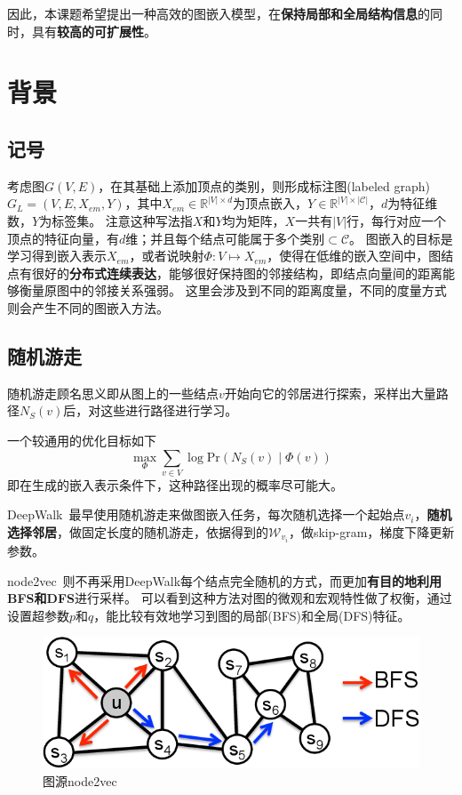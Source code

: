 \documentclass[reportComp]{thesis}
\begin{document}
因此，本课题希望提出一种高效的图嵌入模型，在\textbf{保持局部和全局结构信息}的同时，具有\textbf{较高的可扩展性}。

\section{背景}
\subsection{记号}
考虑图$G(V,E)$，在其基础上添加顶点的类别，则形成标注图(labeled graph)$G_L=(V,E,X_{em},Y)$，其中$X_{em}\in\mathbb{R}^{|V|\times d}$为顶点嵌入，$Y\in\mathbb{R}^{|V|\times |\mathcal{C}|}$，$d$为特征维数，$Y$为标签集。
注意这种写法指$X$和$Y$均为矩阵，$X$一共有$|V|$行，每行对应一个顶点的特征向量，有$d$维；并且每个结点可能属于多个类别$\subset \mathcal{C}$。
图嵌入的目标是学习得到嵌入表示$X_{em}$，或者说映射$\Phi:V\mapsto X_{em}$，使得在低维的嵌入空间中，图结点有很好的\textbf{分布式连续表达}，能够很好保持图的邻接结构，即结点向量间的距离能够衡量原图中的邻接关系强弱。
这里会涉及到不同的距离度量，不同的度量方式则会产生不同的图嵌入方法。

\subsection{随机游走}
随机游走顾名思义即从图上的一些结点$v$开始向它的邻居进行探索，采样出大量路径$N_S(v)$后，对这些进行路径进行学习。

一个较通用的优化目标如下
\[\max_\Phi\sum_{v\in V}\log\mathrm{Pr}(N_S(v)\mid \Phi(v))\]
即在生成的嵌入表示条件下，这种路径出现的概率尽可能大。

DeepWalk~\cite{perozzi:deepwalk_kdd_2014}最早使用随机游走来做图嵌入任务，每次随机选择一个起始点$v_i$，\textbf{随机选择邻居}，做固定长度的随机游走，依据得到的$\mathcal{W}_{v_i}$，做skip-gram，梯度下降更新参数。

node2vec~\cite{grover:node2vec_kdd_2016}则不再采用DeepWalk每个结点完全随机的方式，而更加\textbf{有目的地利用BFS和DFS}进行采样。
可以看到这种方法对图的微观和宏观特性做了权衡，通过设置超参数$p$和$q$，能比较有效地学习到图的局部(BFS)和全局(DFS)特征。
\begin{figure}[H]
\centering
\includegraphics[width=0.6\linewidth]{fig/node2vec.png}
\caption{图源node2vec~\cite{grover:node2vec_kdd_2016}}
\end{figure}
\end{document}
